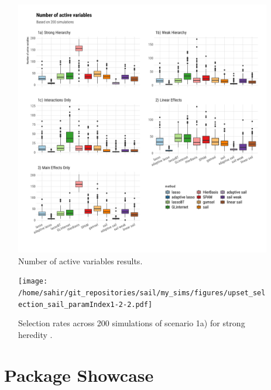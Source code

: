 \begin{knitrout}\scriptsize
	\color{fgcolor}\begin{figure}[H]
		
		{\centering \includegraphics[width=1\linewidth]{figs/plot-nactive-sim-1} 
			
		}
		
		\caption[Number of active variables results]{Number of active variables results.}\label{fig:plot-nactive-sim}
	\end{figure}
	
	
\end{knitrout}


\begin{figure}[H]
	\centering
	\texttt{[image: /home/sahir/git\_repositories/sail/my\_sims/figures/upset\_selection\_sail\_paramIndex1-2-2.pdf]}
	\caption{Selection rates across 200 simulations of scenario 1a) for strong heredity \sail.}\label{fig:upset}
\end{figure}

\FloatBarrier 

\section{\sail ~Package Showcase} \label{ap:showcase}

